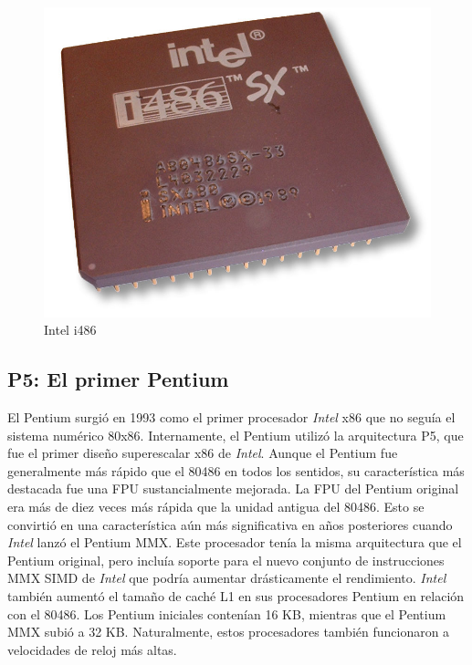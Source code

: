 \begin{figure}[htb]
	\centering
	\includegraphics[scale = 0.15]{Graphics/Intel_80486sx.jpg}
	\caption{Intel i486}
	\label{fig:21}
\end{figure}

\subsection{P5: El primer Pentium}
El Pentium surgió en 1993 como el primer procesador \emph{Intel} x86 que no seguía el sistema numérico 80x86. Internamente, el Pentium utilizó la arquitectura P5, que fue el 
primer diseño superescalar x86 de \emph{Intel}. Aunque el Pentium fue generalmente más rápido que el 80486 en todos los sentidos, su característica más destacada fue una FPU 
sustancialmente mejorada. La FPU del Pentium original era más de diez veces más rápida que la unidad antigua del 80486. Esto se convirtió en una característica aún más 
significativa en años posteriores cuando \emph{Intel} lanzó el Pentium MMX. Este procesador tenía la misma arquitectura que el Pentium original, pero incluía soporte para el 
nuevo conjunto de instrucciones MMX SIMD de \emph{Intel} que podría aumentar drásticamente el rendimiento. \emph{Intel} también aumentó el tamaño de caché L1 en sus procesadores Pentium 
en relación con el 80486. Los Pentium iniciales contenían 16 KB, mientras que el Pentium MMX subió a 32 KB. Naturalmente, estos procesadores también funcionaron a 
velocidades de reloj más altas.

